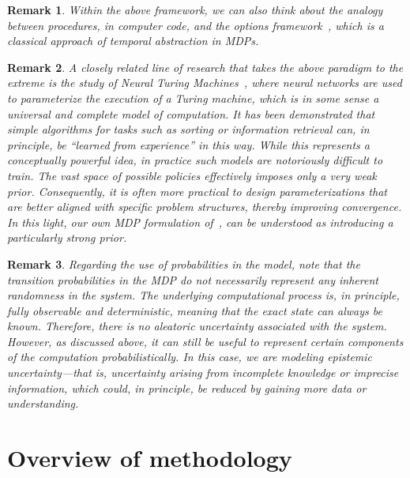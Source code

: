 \documentclass[a4paper]{report}
\theoremstyle{definition}
\theoremstyle{plain}
\newtheorem*{remark}{Remark}
\begin{document}
\begin{remark}
  Within the above framework, we can also think about the analogy between
  procedures, in computer code, and the \emph{options
    framework}~\cite{suttonMDPsSemiMDPsFramework1999}, which is a classical
  approach of temporal abstraction in MDPs.
\end{remark}

\begin{remark}
  A closely related line of research that takes the above paradigm to the
  extreme is the study of \emph{Neural Turing Machines}~\cite{gravesNeuralTuringMachines2014}, where neural
  networks are used to parameterize the execution of a Turing machine, which is
  in some sense a universal and complete model of computation.
  It has been demonstrated that simple algorithms for tasks such as sorting or
  information retrieval can, in principle, be ``learned from experience'' in
  this way.
  While this represents a conceptually powerful idea, in
  practice such models are notoriously difficult to train. The vast space of
  possible policies effectively imposes only a very weak prior. Consequently, it
  is often more practical to design parameterizations that are better aligned
  with specific problem structures, thereby improving convergence.
%
  In this light, our own MDP formulation of~, can be understood as
  introducing a particularly strong prior.
\end{remark}

\begin{remark}
  Regarding the use of probabilities in the model, note that the transition
  probabilities in the MDP do not necessarily represent any inherent randomness
  in the system. The underlying computational process is, in principle, fully
  observable and deterministic, meaning that the exact state can always be
  known. Therefore, there is no \emph{aleatoric uncertainty} associated with the
  system. However, as discussed above, it can still be useful to represent
  certain components of the computation probabilistically. In this case, we are
  modeling \emph{epistemic uncertainty}---that is, uncertainty arising from
  incomplete knowledge or imprecise information, which could, in principle, be
  reduced by gaining more data or understanding.
\end{remark}


\clearpage
\section{Overview of methodology}
\end{document}
